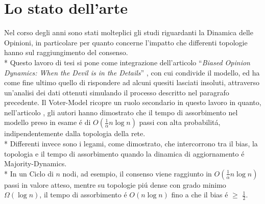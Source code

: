 \documentclass[../Tesi.tex]{subfiles}
\begin{document}
\section{Lo stato dell'arte}
Nel corso degli anni sono stati molteplici gli studi riguardanti la Dinamica delle Opinioni, in particolare per quanto concerne l'impatto che differenti topologie hanno sul raggiungimento del consenso.\\*
Questo lavoro di tesi si pone come integrazione dell'articolo ``\emph{Biased Opinion Dynamics: When the Devil is in the Details}'' \cite{DBLP:journals/corr/abs-2008-13589}, con cui condivide il modello, ed ha come fine ultimo quello di rispondere ad alcuni quesiti lasciati insoluti, attraverso un'analisi dei dati ottenuti simulando il processo descritto nel paragrafo precedente.
Il Voter-Model ricopre un ruolo secondario in questo lavoro in quanto, nell'articolo \cite{DBLP:journals/corr/abs-2008-13589}, gli autori hanno dimostrato che il tempo di assorbimento nel modello preso in esame \'e di $O(\frac{1}{\alpha}n\log{}n)$ passi con alta probabilit\'a, indipendentemente dalla topologia della rete.\\*
Differenti invece sono i legami, come dimostrato, che intercorrono tra il bias, la topologia e il tempo di assorbimento quando la dinamica di aggiornamento \'e Majority-Dynamics.\\*
In un Ciclo di $n$ nodi, ad esempio, il consenso viene raggiunto in $O(\frac{1}{\alpha}n\log{}n)$ passi in valore atteso, mentre su topologie pi\'u dense con grado minimo $\Omega(\log{}n)$, il tempo di assorbimento \'e $O(n\log{}n)$ fino a che il bias \'e $\geq$ $\frac{1}{2}$.
\end{document}
